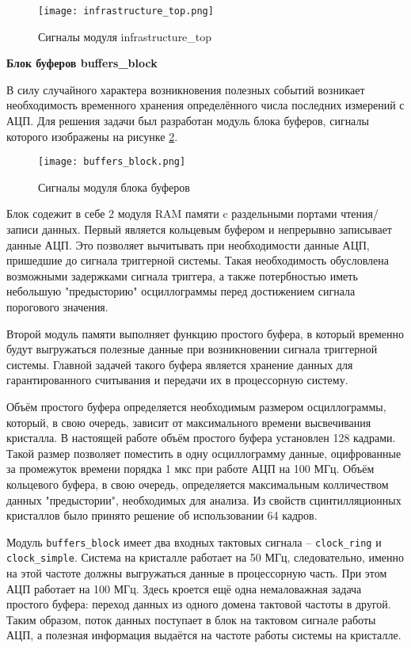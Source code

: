 \begin{figure}[ht]
    \centering
    \texttt{[image: infrastructure\_top.png]}
    \caption{Сигналы модуля infrastructure\_top}
    \label{fig:infrastructure_top}
\end{figure}
\textbf{Блок буферов buffers\_block}\par
В силу случайного характера возникновения полезных событий возникает необходимость временного хранения определённого числа последних измерений с АЦП. Для решения задачи был разработан модуль блока буферов, сигналы которого изображены на рисунке \ref{fig:buffers_block}.\par
\begin{figure}[ht]
    \centering
    \texttt{[image: buffers\_block.png]}
    \caption{Сигналы модуля блока буферов}
    \label{fig:buffers_block}
\end{figure}
Блок содежит в себе 2 модуля RAM памяти c раздельными портами чтения/записи данных. Первый является кольцевым буфером и непрерывно записывает данные АЦП. Это позволяет вычитывать при необходимости данные АЦП, пришедшие до сигнала триггерной системы. Такая необходимость обусловлена возможными задержками сигнала триггера, а также потербностью иметь небольшую "предысторию" осциллограммы перед достижением сигнала порогового значения.\par
Второй модуль памяти выполняет функцию простого буфера, в который временно будут выгружаться полезные данные при возникновении сигнала триггерной системы. Главной задачей такого буфера является хранение данных для гарантированного считывания и передачи их в процессорную систему.\par
Объём простого буфера определяется необходимым размером осциллограммы, который, в свою очередь, зависит от максимального времени высвечивания кристалла. В настоящей работе объём простого буфера установлен 128 кадрами. Такой размер позволяет поместить в одну осциллограмму данные, оцифрованные за промежуток времени порядка 1 мкс при работе АЦП на 100 МГц. Объём кольцевого буфера, в свою очередь, определяется максимальным колличеством данных "предыстории", необходимых для анализа. Из свойств сцинтилляционных кристаллов было принято решение об использовании 64 кадров.\par
Модуль \texttt{buffers\_block} имеет два входных тактовых сигнала -- \texttt{clock\_ring} и \texttt{clock\_simple}. Система на кристалле работает на 50 МГц, следовательно, именно на этой частоте должны выгружаться данные в процессорную часть. При этом АЦП работает на 100 МГц. Здесь кроется ещё одна немаловажная задача простого буфера: переход данных из одного домена тактовой частоты в другой. Таким образом, поток данных поступает в блок на тактовом сигнале работы АЦП, а полезная информация выдаётся на частоте работы системы на кристалле.\par
